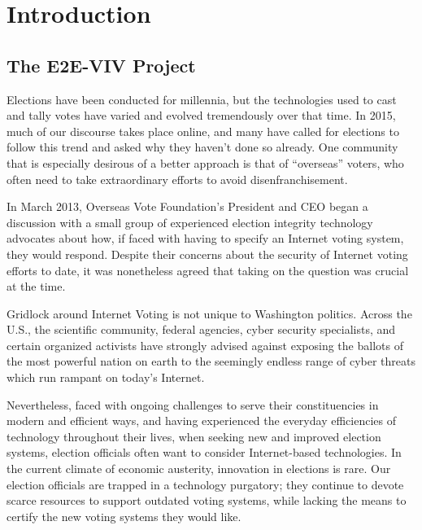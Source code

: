 \chapter{Introduction}
\label{chapter:introduction}

\section{The E2E-VIV Project}
\label{sec:e2e-viv-project}


Elections have been conducted for millennia, but the technologies used
to cast and tally votes have varied and evolved tremendously over that
time. In 2015, much of our discourse takes place online, and many have
called for elections to follow this trend and asked why they haven't
done so already. One community that is especially desirous of a better
approach is that of ``overseas'' voters, who often need to take
extraordinary efforts to avoid disenfranchisement.

In March 2013, Overseas Vote Foundation’s President and CEO began a
discussion with a small group of experienced election integrity
technology advocates about how, if faced with having to specify an
Internet voting system, they would respond. Despite their concerns
about the security of Internet voting efforts to date, it was
nonetheless agreed that taking on the question was crucial at the
time.

Gridlock around Internet Voting is not unique to Washington
politics. Across the U.S., the scientific community, federal agencies,
cyber security specialists, and certain organized activists have
strongly advised against exposing the ballots of the most powerful
nation on earth to the seemingly endless range of cyber threats which
run rampant on today’s Internet.

Nevertheless, faced with ongoing challenges to serve their
constituencies in modern and efficient ways, and having experienced
the everyday efficiencies of technology throughout their lives, when
seeking new and improved election systems, election officials often
want to consider Internet-based technologies. In the current climate
of economic austerity, innovation in elections is rare. Our election
officials are trapped in a technology purgatory; they continue to
devote scarce resources to support outdated voting systems, while
lacking the means to certify the new voting systems they would like.

